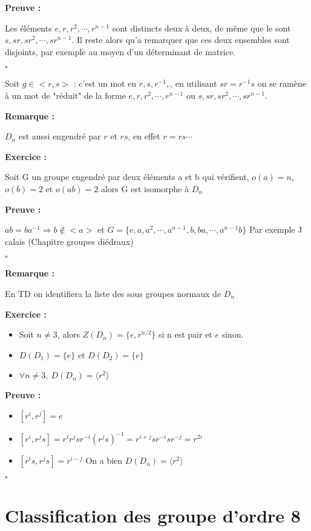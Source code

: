 \documentclass{report}
\renewenvironment{leftbar}{%
  \def\FrameCommand{\vrule width 0.4pt \hspace{10pt}}%
  \MakeFramed {\advance\hsize-\width \FrameRestore}}%
 {\endMakeFramed}%
\newenvironment{preuve}{\vspace*{0.5cm}
    \begin{leftbar}
    \noindent\textbf{Preuve :}\par}{
    \begin{flushright}
    $\square$
    \end{flushright}
    \end{leftbar}
}
\newenvironment{exo}{\begin{tcolorbox}[colframe= white]
    \textbf{Exercice :}
    \par}
    {\end{tcolorbox}}
\newcommand{\remarque}{
    \noindent\textbf{Remarque :} \par
}
\newcommand{\dn}{D_{n}}
\begin{document}
\begin{preuve}
Les éléments $e,r,r^2,\cdots,r^{n-1}$ sont distincts deux à deux, de même que le sont $s,sr,sr^2,\cdots,sr^{n-1}$. Il reste alors qu'a remarquer que ces deux ensembles sont disjoints, par exemple au moyen d'un déterminant de matrice.
\end{preuve}

Soit $g\in < r,s >$ :  c'est un mot en $r,s,r^{-1},$, en utilisant $sr=r^{-1}s$ on se ramène à un mot de "réduit" de la forme $e,r,r^2,\cdots,r^{n-1}$ ou $s,sr,sr^2,\cdots,sr^{n-1}$.

\remarque{$D_{n}$ est aussi engendré par $r$ et $rs$, en effet $r=rs\cdots$}

\begin{exo}
Soit G un groupe engendré par deux éléments a et b qui vérifient, $o(a)=n$, $o(b)=2$ et $o(ab)=2$ alors G est isomorphe à $D_{n}$
\end{exo}

\begin{preuve}
$ab=ba^{-1} \Rightarrow b\notin <a>$ et $G=\{e,a,a^{2},\cdots,a^{n-1},b,ba,\cdots,a^{n-1}b \}$ Par exemple J calais (Chapitre groupes diédraux)
\end{preuve}

\remarque{En TD on identifiera la liste des sous groupes normaux de $D_{n}$}

\begin{exo}
\begin{itemize}[label=$\bullet$]
\item Soit $n\neq3$, alors $ Z(\dn)= \{ e,r^{n/2} \} $ si n est pair et $e$ sinon.
\item $D(D_{1}) = \{ e \}$ et $D(D_{2}) = \{ e \}$
\item $\forall n\neq 3, ~D(\dn) = \langle r^{2}\rangle$
\end{itemize}
\end{exo}

\begin{preuve}
\begin{itemize}
\item $[r^i,r^j]=e$
\item $[r^{i},r^{j}s]=r^{i}r^{j}sr^{-i}(r^{j}s)^{-1} = r^{i+j}sr^{-i}sr^{-j}=r^{2i}$
\item $[r^{i}s,r^{j}s]=r^{i-j}$
On a bien $D(\dn) = \langle r^{2}\rangle$
\end{itemize}
\end{preuve}

\section{Classification des groupe d'ordre 8}
\end{document}
